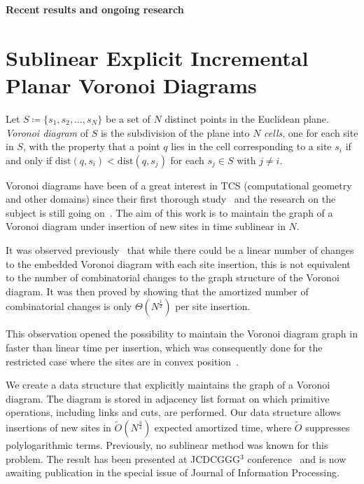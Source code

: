 \documentclass[a4paper,11pt]{article}
\def\vsection#1{\vspace{-4.5mm}\section{#1}\vspace{-3.5mm}}
\theoremstyle{definition}
\begin{document}
\def\P{\mathcal P} \def\Ot{\tilde O}

\begin{center}
	{\LARGE\bf Recent results and ongoing research}
\end{center} \vspace{-3.8mm}

\vsection{Sublinear Explicit Incremental Planar Voronoi Diagrams}

	Let $S \coloneqq \{s_1, s_2, \ldots, s_N\}$ be a set of $N$ distinct points in the Euclidean plane. \emph{Voronoi diagram} of $S$ is the subdivision of the plane into $N$ \emph{cells}, one for each site in $S$, with the property that a point $q$ lies in the cell corresponding to a site $s_i$ if and only if $\mathrm{dist} (q, s_i) < \mathrm{dist} (q, s_j)$ for each $s_j \in S$ with $j \ne i$.

Voronoi diagrams have been of a great interest in TCS (computational geometry and other domains) since their first thorough study~\cite{v-vd} and the research on the subject is still going on~\cite{vd-new}. The aim of this work is to maintain the graph of a Voronoi diagram under insertion of new sites in time sublinear in $N$.

It was observed previously~\cite{incremental-vd} that while there could be a linear number of changes to the embedded Voronoi diagram with each site insertion, this is not equivalent to the number of combinatorial changes to the graph structure of the Voronoi diagram.
It was then proved by showing that the amortized number of combinatorial changes is only $\Theta(N^{\frac 12})$ per site insertion.

This observation opened the possibility to maintain the Voronoi diagram graph in faster than linear time per insertion, which was consequently done for the restricted case where the sites are in convex position~\cite{incremental-vd}.

We create a data structure that explicitly maintains the graph of a Voronoi diagram. The diagram is stored in adjacency list format on which primitive operations, including links and cuts, are performed. Our data structure allows insertions of new sites in $\Ot (N^{\frac 34})$ expected amortized time, where $\Ot$ suppresses polylogarithmic terms. Previously, no sublinear method was known for this problem. The result has been presented at JCDCGGG$^3$ conference~\cite{sevd} and is now awaiting publication in the special issue of Journal of Information Processing.
\end{document}
